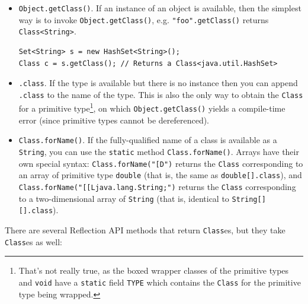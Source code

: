 \documentclass[table, xcdraw]{article}%
\begin{document}
\begin{itemize}
    \item \texttt{Object.getClass()}. If an instance of an object is available, then the simplest way is to invoke \texttt{Object.getClass()}, e.g. \texttt{"foo".getClass()} returns \texttt{Class<String>}.
    \begin{verbatim}
Set<String> s = new HashSet<String>();
Class c = s.getClass(); // Returns a Class<java.util.HashSet>
    \end{verbatim}

    \item \texttt{.class}. If the type is available but there is no instance then you can append \texttt{.class} to the name of the type. This is also the only way to obtain the \texttt{Class} for a primitive type\footnote{That's not really true, as the boxed wrapper classes of the primitive types and \texttt{void} have a \texttt{static} field \texttt{TYPE} which contains the \texttt{Class} for the primitive type being wrapped.}, on which \texttt{Object.getClass()} yields a compile-time error (since primitive types cannot be dereferenced).

    \item \texttt{Class.forName()}. If the fully-qualified name of a class is available as a \texttt{String}, you can use the \texttt{static} method \texttt{Class.forName()}. Arrays have their own special syntax: \texttt{Class.forName("[D")} returns the \texttt{Class} corresponding to an array of primitive type \texttt{double} (that is, the same as \texttt{double[].class}), and \texttt{Class.forName("[[Ljava.lang.String;")} returns the \texttt{Class} corresponding to a two-dimensional array of \texttt{String} (that is, identical to \texttt{String[][].class}).
\end{itemize}

There are several Reflection API methods that return \texttt{Class}es, but they take \texttt{Class}es as well:
\end{document}
